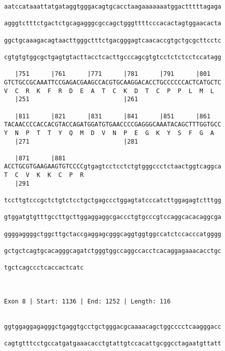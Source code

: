 \documentclass{article}
\begin{document}
\begin{Verbatim}
aatccataaattatgataggtgggacagtgcacctaagaaaaaaatggactttttagaga
                                                            
agggtctttctgactctgcagagggcgccagctgggttttcccacactagtggaacacta
                                                            
ggctgcaaagacagtaacttgggctttctgacgggagtcaacaccgtgctgcgcttcctc
                                                            
cgtgtgtggcgctgagtgtacttacctcacttgcccagcgtgtcctctctcctccatagg
                                                            
   |751      |761      |771      |781      |791      |801   
GTCTGCCGCAAATTCCGAGACGAAGCCACGTGCAAGGACACCTGCCCCCCACTCATGCTC
V  C  R  K  F  R  D  E  A  T  C  K  D  T  C  P  P  L  M  L  
   |251                          |261                       
  
   |811      |821      |831      |841      |851      |861   
TACAACCCCACCACGTACCAGATGGATGTGAACCCCGAGGGCAAATACAGCTTTGGTGCC
Y  N  P  T  T  Y  Q  M  D  V  N  P  E  G  K  Y  S  F  G  A  
   |271                          |281                       
  
   |871      |881                                           
ACCTGCGTGAAGAAGTGTCCCCgtgagtcctcctctgtgggccctctaactggtcaggca
T  C  V  K  K  C  P  R                                      
   |291                                                     
  
tccttgtcccgctctgtctcctgctgagccctggagtatcccatcttggagagtctttgg
                                                            
gtggatgtgtttgccttgcttggaggaggcgaccctgtgcccgtccaggcacacaggcga
                                                            
ggggaggggctggcttgctaccgaggagcgggcaggtggtggccatctccacccatgggg
                                                            
gctgctcagtgcacagggcagatctgggtggccaggccacctcacaggagaaacacctgc
                                                            
tgctcagccctcaccactcatc
                      
                      
 
Exon 8 | Start: 1136 | End: 1252 | Length: 116


ggtggaggagagggctgaggtgcctgctgggacgcaaaacagctggcccctcaagggacc
                                                            
cagtgtttcctgccatgatgaaacacctgtattgtccacattgcggcctagaatgttatt
                                                            

\end{Verbatim}
\end{document}
